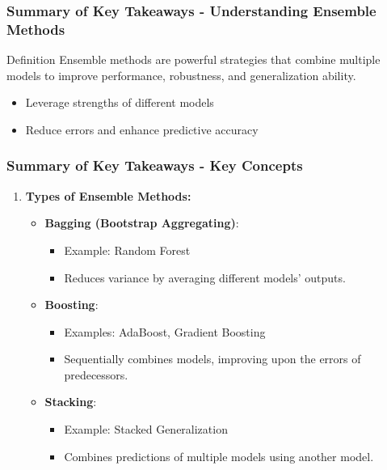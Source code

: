 \documentclass[aspectratio=169]{beamer}
\begin{document}
\begin{frame}[fragile]
    \frametitle{Summary of Key Takeaways - Understanding Ensemble Methods}
    \begin{block}{Definition}
        Ensemble methods are powerful strategies that combine multiple models to improve performance, robustness, and generalization ability.
    \end{block}
    \begin{itemize}
        \item Leverage strengths of different models
        \item Reduce errors and enhance predictive accuracy
    \end{itemize}
\end{frame}

\begin{frame}[fragile]
    \frametitle{Summary of Key Takeaways - Key Concepts}
    \begin{enumerate}
        \item \textbf{Types of Ensemble Methods:}
            \begin{itemize}
                \item \textbf{Bagging (Bootstrap Aggregating)}:
                    \begin{itemize}
                        \item Example: Random Forest
                        \item Reduces variance by averaging different models' outputs.
                    \end{itemize}
                \item \textbf{Boosting}:
                    \begin{itemize}
                        \item Examples: AdaBoost, Gradient Boosting
                        \item Sequentially combines models, improving upon the errors of predecessors.
                    \end{itemize}
                \item \textbf{Stacking}:
                    \begin{itemize}
                        \item Example: Stacked Generalization
                        \item Combines predictions of multiple models using another model.
                    \end{itemize}
            \end{itemize}
    \end{enumerate}
\end{frame}
\end{document}
